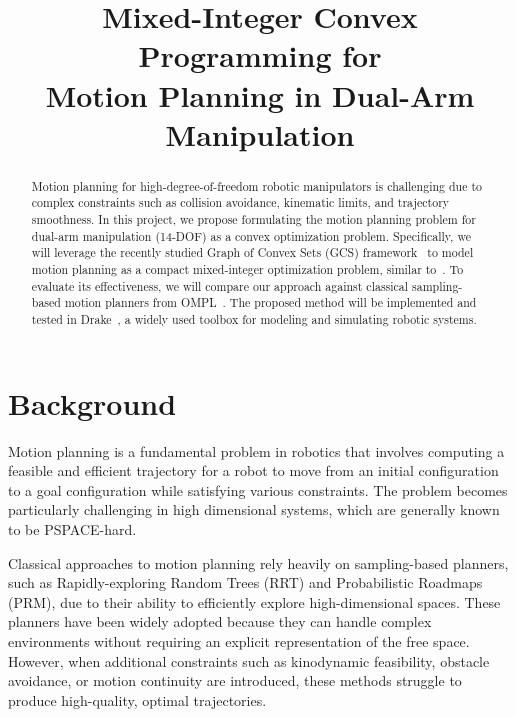 \documentclass[conference]{IEEEtran}
\begin{document}
\title{Mixed-Integer Convex Programming for \\Motion Planning in Dual-Arm Manipulation}

\author{
}

\maketitle

\begin{abstract}
Motion planning for high-degree-of-freedom robotic manipulators is challenging due to complex constraints such as collision avoidance, kinematic limits, and trajectory smoothness.
%
In this project, we propose formulating the motion planning problem for dual-arm manipulation (14-DOF) as a convex optimization problem.
%
Specifically, we will leverage the recently studied Graph of Convex Sets (GCS) framework~\cite{marcucci2024shortest} to model motion planning as a compact mixed-integer optimization problem, similar to~\cite{marcucci2023motion}.
%
To evaluate its effectiveness, we will compare our approach against classical sampling-based motion planners from OMPL~\cite{sucan2012open}.
%
The proposed method will be implemented and tested in Drake~\cite{drake}, a widely used toolbox for modeling and simulating robotic systems.
\end{abstract}

\section{Background}

Motion planning is a fundamental problem in robotics that involves computing a feasible and efficient trajectory for a robot to move from an initial configuration to a goal configuration while satisfying various constraints\cite{lavalle2006planning}.
%
The problem becomes particularly challenging in high dimensional systems, which are generally known to be PSPACE-hard\cite{reif1979complexity}.

Classical approaches to motion planning rely heavily on sampling-based planners, such as Rapidly-exploring Random Trees (RRT)\cite{lavalle2001randomized} and Probabilistic Roadmaps (PRM)\cite{kavraki1996probabilistic}, due to their ability to efficiently explore high-dimensional spaces.
%
These planners have been widely adopted because they can handle complex environments without requiring an explicit representation of the free space.
%
However, when additional constraints such as kinodynamic feasibility, obstacle avoidance, or motion continuity are introduced, these methods struggle to produce high-quality, optimal trajectories.
\end{document}
